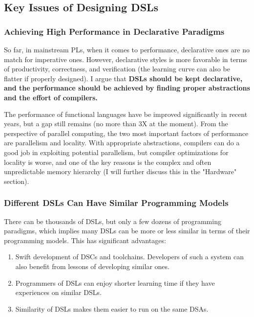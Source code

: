 \documentclass[11pt]{article}
\begin{document}
\subsection{Key Issues of Designing DSLs}
\subsubsection*{Achieving High Performance in Declarative Paradigms}
So far, in mainstream PLs, when it comes to performance, declarative ones are no match for imperative ones.
However, declarative styles is more favorable in terms of productivity, correctness, and verification (the learning curve can also be flatter if properly designed).
I argue that \textbf{DSLs should be kept declarative, and the performance should be achieved by finding proper abstractions and the effort of compilers.}

The performance of functional languages have be improved significantly in recent years, but a gap still remains (no more than 3X at the moment).
From the perspective of parallel computing, the two most important factors of performance are parallelism and locality.
With appropriate abstractions, compilers can do a good job in exploiting potential parallelism, but compiler optimizations for locality is worse, and one of the key reasons is the complex and often unpredictable memory hierarchy (I will further discuss this in the "Hardware" section).


\subsubsection*{Different DSLs Can Have Similar Programming Models}
There can be thousands of DSLs, but only a few dozens of programming paradigms, which implies many DSLs can be more or less similar in terms of their programming models.
This has significant advantages:
\begin{enumerate}
    \item Swift development of DSCs and toolchains.
    Developers of such a system can also benefit from lessons of developing similar ones.
    \item Programmers of DSLs can enjoy shorter learning time if they have experiences on similar DSLs.
    \item Similarity of DSLs makes them easier to run on the same DSAs.
\end{enumerate}
\end{document}
